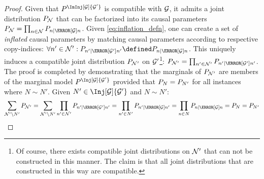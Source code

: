 \documentclass[aps, 10pt, english, twoside, pra, nofootinbib, tightenlines, longbibliography, superscriptaddress]{revtex4-1}
\begin{document}
    \begin{proof}
        Given that $\prob^{\ImInj[\graph]{\graph'}}$ is compatible with $\mathcal{G}$, it admits a joint distribution $\prob[\nodes]$ that can be factorized into its causal parameters $\prob[\nodes] = \prod_{n \in \nodes} \prob[n\mid \Pa[\graph]{n}]$. Given \cref{eq:inflation_defn}, one can create a set of \textit{inflated} causal parameters by matching causal parameters according to respective copy-indices: $\forall n' \in \nodes' : \prob[n'\mid \Pa[\graph']{n'}] \defined \prob[n\mid \Pa[\graph]{n}]$. This uniquely induces a compatible joint distribution $\prob[\nodes']$ on $\mathcal{G}'$\footnote{Of course, there exists compatible joint distributions on $\mathcal{N}'$ that can not be constructed in this manner. The claim is that all joint distributions that are constructed in this way are compatible.}: $\prob[\nodes'] = \prod_{n' \in \nodes'} \prob[n'\mid \Pa[\graph']{n'}]$. The proof is completed by demonstrating that the marginals of $\prob[\nodes']$ are members of the marginal model $\prob^{\Inj[\graph]{\graph'}}$ provided that $\prob[N] = \prob[N']$ for all instances where $N \sim N'$. Given $N' \in \Inj[\graph]{\graph'}$ and $N \sim N'$:
        \[ \sum_{\nodes' \setminus N'} \prob[\nodes'] = \sum_{\nodes' \setminus N'} \prod_{n' \in \nodes'} \prob[n'\mid \Pa[\graph']{n'}] = \prod_{n' \in N'} \prob[n'\mid \Pa[\graph]{n'}] = \prod_{n \in N} \prob[n\mid \Pa[\graph]{n}] = \prob[N] = \prob[N']  \]
    \end{proof}


\end{document}
